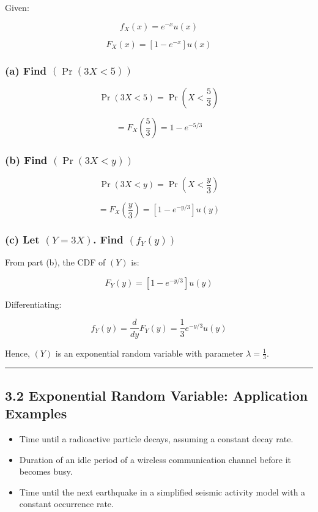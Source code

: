 \documentclass[12pt]{article}
\begin{document}
Given:

\[
f_X(x)=e^{-x}u(x)
\]

\[
F_X(x)=[1-e^{-x}]u(x)
\]

\subsubsection*{\textbf{(a) Find $(\Pr(3X<5))$}}

\[
\Pr(3X<5)=\Pr\left(X<\frac{5}{3}\right)
\]

\[
=F_X\left(\frac{5}{3}\right)=1-e^{-5/3}
\]

\subsubsection*{\textbf{(b) Find $(\Pr(3X<y))$}}

\[
\Pr(3X<y)=\Pr\left(X<\frac{y}{3}\right)
\]

\[
=F_X\left(\frac{y}{3}\right)=[1-e^{-y/3}]u(y)
\]

\subsubsection*{\textbf{(c) Let $(Y=3X)$. Find $(f_Y(y))$}}

From part (b), the CDF of $(Y)$ is:

\[
F_Y(y)=[1-e^{-y/3}]u(y)
\]

Differentiating:

\[
f_Y(y)=\frac{d}{dy}F_Y(y)=\frac{1}{3}e^{-y/3}u(y)
\]

Hence, $(Y)$ is an exponential random variable with parameter $\lambda=\frac{1}{3}$.

\hrule
\vspace{1em}

\subsection*{\textbf{3.2 Exponential Random Variable: Application Examples}}

\begin{itemize}
    \item Time until a radioactive particle decays, assuming a constant decay rate.
    \item Duration of an idle period of a wireless communication channel before it becomes busy.
    \item Time until the next earthquake in a simplified seismic activity model with a constant occurrence rate.
\end{itemize}
\end{document}

